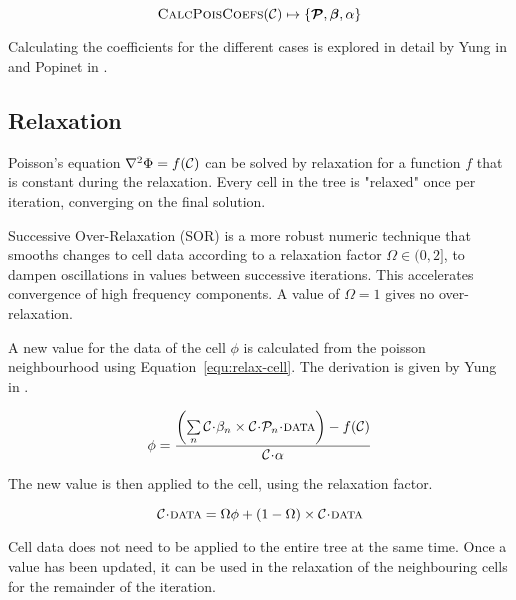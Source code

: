 \documentclass[twoside]{IIBproject}
\newcommand{\vect} [1] {\bm{#1}}
\newcommand{\acc}{{\mkern 0.5mu\cdot\mkern 0.5mu}}
\numberwithin{figure}{section}
\begin{document}
        \begin{equation}
            \label{fun:CalcPoisCoefs}
            \textproc{CalcPoisCoefs}(\mathcal{C}) \mapsto \{ \vect{\mathcal{P}}, \vect{\beta}, \alpha \}
        \end{equation}

        Calculating the coefficients for the different cases is explored in detail by Yung in \cite{Yung2010} and Popinet in \cite{pop03}.  



    \subsection{Relaxation} %
        \label{sec:relaxation}

        Poisson's equation $\laplacian{\Phi}=f(\mathcal{C})$ can be solved by relaxation for a function $f$ that is constant during the relaxation. Every cell in the tree is "relaxed" once per iteration, converging on the final solution. 

        Successive Over-Relaxation (SOR) is a more robust numeric technique that smooths changes to cell data according to a relaxation factor $\Omega \in (0,2]$, to dampen oscillations in values between successive iterations. This accelerates convergence of high frequency components. A value of $\Omega=1$ gives no over-relaxation. 

        A new value for the data of the cell $\phi$ is calculated from the poisson neighbourhood using Equation~\ref{equ:relax-cell}. The derivation is given by Yung in \cite{Yung2010}.

        \begin{equation}
            \phi = \frac{ \left( \sum\limits_n \mathcal{C}\acc\beta_n \times \mathcal{C}\acc\mathcal{P}_n\acc\textproc{data} \right)-f(\mathcal{C})} { \mathcal{C}\acc\alpha }
            \label{equ:relax-cell}
        \end{equation}

        The new value is then applied to the cell, using the relaxation factor. 

        \begin{equation}
            \mathcal{C}\acc\textproc{data} = \Omega\phi + (1-\Omega)\times\mathcal{C}\acc\textproc{data}
        \end{equation}

        Cell data does not need to be applied to the entire tree at the same time. Once a value has been updated, it can be used in the relaxation of the neighbouring cells for the remainder of the iteration. 
\end{document}
